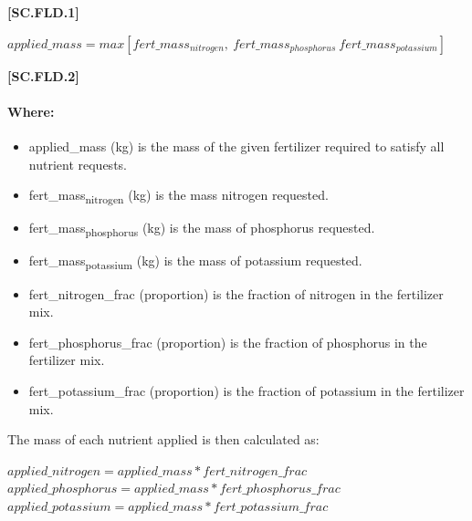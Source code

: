            {\raggedleft \textbf{[SC.FLD.1]}\par}
            \vspace{0.5cm} 
    
    \begin{center}
        \(applied\_mass = max[fert\_mass_{nitrogen},\ fert\_mass_{phosphorus}\ fert\_mass_{potassium}] \)
    \end{center}
        \vspace{0.5cm} 
    
            {\raggedleft \textbf{[SC.FLD.2]}\par}
            \vspace{0.5cm} 

\paragraph{Where:}
\begin{itemize}
    \item applied\_mass (kg) is the mass of the given fertilizer required to satisfy all nutrient requests.
    \item fert\_mass\textsubscript{nitrogen} (kg) is the mass nitrogen requested.
    \item fert\_mass\textsubscript{phosphorus} (kg) is the mass of phosphorus requested.
    \item fert\_mass\textsubscript{potassium} (kg) is the mass of potassium requested.
    \item fert\_nitrogen\_frac (proportion) is the fraction of nitrogen in the fertilizer mix.
    \item fert\_phosphorus\_frac (proportion) is the fraction of phosphorus in the fertilizer mix.
    \item fert\_potassium\_frac (proportion) is the fraction of potassium in the fertilizer mix.
\end{itemize}


The mass of each nutrient applied is then calculated as:
            \vspace{0.5cm}        
    
    \begin{center}
        \(applied\_nitrogen=applied\_mass * fert\_nitrogen\_frac\) \\ 
        \(applied\_phosphorus=applied\_mass * fert\_phosphorus\_frac\) \\
        \(applied\_potassium=applied\_mass * fert\_potassium\_frac\)
    \end{center}
        \vspace{0.5cm} 
    
